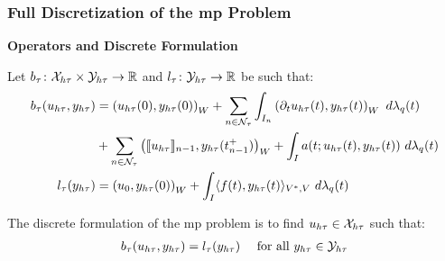 \begin{frame}
    \frametitle{Full Discretization of the \acrshort{mp} Problem}

    \vspace*{\fill}
    \begin{center}
        {\color{\accentcolor} \Large \textbf{Operators and Discrete Formulation}}
        \vspace*{0.25cm}

        \begin{minipage}{0.75\textwidth}
            \begin{definition}
                Let $b_{\tau} \colon \mathcal{X}_{h \tau} \times \mathcal{Y}_{h \tau} \rightarrow \mathbb{R}$ and $l_{\tau} \colon \mathcal{Y}_{h \tau} \rightarrow \mathbb{R}$ be such that:
                \begin{align*}
                    b_{\tau}(u_{h \tau}, y_{h \tau}) & = \left( u_{h \tau}(0), y_{h \tau}(0) \right)_W + \sum_{n \in \mathcal{N}_{\tau}} \int_{I_n} \left( \partial_t u_{h \tau}(t), y_{h \tau}(t) \right)_W ~ d \lambda_q(t) \\
                    & + \sum_{n \in \mathcal{N}_{\tau}} \left( \llbracket u_{h \tau} \rrbracket_{n - 1}, y_{h \tau}(t_{n - 1}^+) \right)_W + \int_I a(t; u_{h \tau}(t), y_{h \tau}(t)) ~ d \lambda_q(t) \\
                    l_{\tau}(y_{h \tau}) & = \left( u_0, y_{h \tau}(0) \right)_W + \int_I \langle f(t), y_{h \tau}(t) \rangle_{V^*, V} ~ d \lambda_q(t)
                \end{align*}
            \end{definition}
        \end{minipage}
    \end{center}

    \vspace*{\fill}

    \begin{center}
        \begin{minipage}{0.75\textwidth}
            \begin{definition}
                The discrete formulation of the \acrshort{mp} problem is to find $u_{h \tau} \in \mathcal{X}_{h \tau}$ such that:
                \begin{align*}
                    b_{\tau}(u_{h \tau}, y_{h \tau}) &= l_{\tau}(y_{h \tau}) &\text{ for all } y_{h \tau} \in \mathcal{Y}_{h \tau}
                \end{align*}
            \end{definition}
        \end{minipage}
    \end{center}
    \vspace*{\fill}
    
\end{frame}


